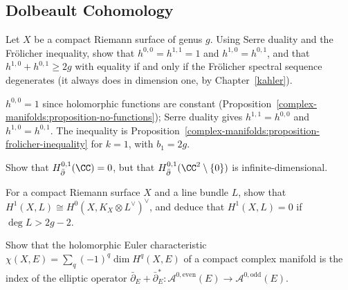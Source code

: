 \subsection{Dolbeault Cohomology}\label{complex-manifolds:subsection-exercises-dolbeault}

\begin{exercise}\label{complex-manifolds:exercise-riemann-surface}
Let $X$ be a compact Riemann surface of genus $g$. Using Serre duality and the Fr\"olicher inequality, show that $h^{0,0} = h^{1,1} = 1$ and $h^{1,0} = h^{0,1}$, and that $h^{1,0} + h^{0,1} \geq 2g$ with equality
if and only if the Fr\"olicher spectral sequence degenerates (it always does in dimension one, by Chapter~\ref{kahler}).
\end{exercise}

\begin{solution}
$h^{0,0} = 1$ since holomorphic functions are constant (Proposition~\ref{complex-manifolds:proposition-no-functions}); Serre duality gives $h^{1,1} = h^{0,0}$ and $h^{1,0} = h^{0,1}$. The inequality is
Proposition~\ref{complex-manifolds:proposition-frolicher-inequality} for $k = 1$, with $b_1 = 2g$.
\end{solution}

\begin{exercise}\label{complex-manifolds:exercise-dolbeault-plane}
Show that $H^{0,1}_{\bar\partial}(\CC) = 0$, but that $H^{0,1}_{\bar\partial}(\CC^2 \setminus \{0\})$ is infinite-dimensional.
\end{exercise}

\begin{exercise}\label{complex-manifolds:exercise-serre-duality-curve}
For a compact Riemann surface $X$ and a line bundle $L$, show that $H^1(X, L) \cong H^0(X, K_X \otimes L^\vee)^\vee$, and deduce that $H^1(X, L) = 0$ if $\deg L > 2g - 2$.
\end{exercise}

\begin{exercise}\label{complex-manifolds:exercise-euler-characteristic-bundle}
Show that the holomorphic Euler characteristic $\chi(X, E) = \sum_q(-1)^q\dim H^q(X, E)$ of a compact complex manifold is the index of the elliptic operator
$\bar\partial_E + \bar\partial_E^* \colon \mathcal{A}^{0,\mathrm{even}}(E) \to \mathcal{A}^{0,\mathrm{odd}}(E)$.
\end{exercise}
